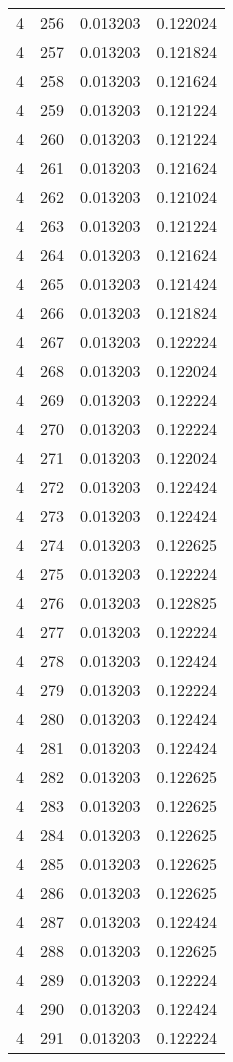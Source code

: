 \begin{longtable}{rrrr}
4 & 256 & 0.013203 & 0.122024 \\
4 & 257 & 0.013203 & 0.121824 \\
4 & 258 & 0.013203 & 0.121624 \\
4 & 259 & 0.013203 & 0.121224 \\
4 & 260 & 0.013203 & 0.121224 \\
4 & 261 & 0.013203 & 0.121624 \\
4 & 262 & 0.013203 & 0.121024 \\
4 & 263 & 0.013203 & 0.121224 \\
4 & 264 & 0.013203 & 0.121624 \\
4 & 265 & 0.013203 & 0.121424 \\
4 & 266 & 0.013203 & 0.121824 \\
4 & 267 & 0.013203 & 0.122224 \\
4 & 268 & 0.013203 & 0.122024 \\
4 & 269 & 0.013203 & 0.122224 \\
4 & 270 & 0.013203 & 0.122224 \\
4 & 271 & 0.013203 & 0.122024 \\
4 & 272 & 0.013203 & 0.122424 \\
4 & 273 & 0.013203 & 0.122424 \\
4 & 274 & 0.013203 & 0.122625 \\
4 & 275 & 0.013203 & 0.122224 \\
4 & 276 & 0.013203 & 0.122825 \\
4 & 277 & 0.013203 & 0.122224 \\
4 & 278 & 0.013203 & 0.122424 \\
4 & 279 & 0.013203 & 0.122224 \\
4 & 280 & 0.013203 & 0.122424 \\
4 & 281 & 0.013203 & 0.122424 \\
4 & 282 & 0.013203 & 0.122625 \\
4 & 283 & 0.013203 & 0.122625 \\
4 & 284 & 0.013203 & 0.122625 \\
4 & 285 & 0.013203 & 0.122625 \\
4 & 286 & 0.013203 & 0.122625 \\
4 & 287 & 0.013203 & 0.122424 \\
4 & 288 & 0.013203 & 0.122625 \\
4 & 289 & 0.013203 & 0.122224 \\
4 & 290 & 0.013203 & 0.122424 \\
4 & 291 & 0.013203 & 0.122224 \\

\end{longtable}
